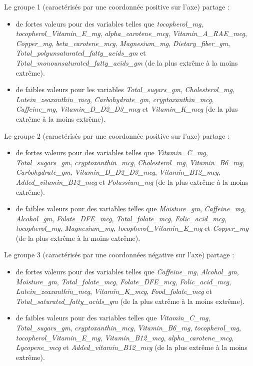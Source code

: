 \documentclass[]{article}
\providecommand{\tightlist}{%
  \setlength{\itemsep}{0pt}\setlength{\parskip}{0pt}}
\begin{document}
Le groupe 1 (caractérisés par une coordonnée positive sur l'axe) partage
:

\begin{itemize}
\tightlist
\item
  de fortes valeurs pour des variables telles que \emph{tocopherol\_mg},
  \emph{tocopherol\_Vitamin\_E\_mg}, \emph{alpha\_carotene\_mcg},
  \emph{Vitamin\_A\_RAE\_mcg}, \emph{Copper\_mg},
  \emph{beta\_carotene\_mcg}, \emph{Magnesium\_mg},
  \emph{Dietary\_fiber\_gm},
  \emph{Total\_polyunsaturated\_fatty\_acids\_gm} et
  \emph{Total\_monounsaturated\_fatty\_acids\_gm} (de la plus extrême à
  la moins extrême).
\item
  de faibles valeurs pour les variables \emph{Total\_sugars\_gm},
  \emph{Cholesterol\_mg}, \emph{Lutein\_zeaxanthin\_mcg},
  \emph{Carbohydrate\_gm}, \emph{cryptoxanthin\_mcg},
  \emph{Caffeine\_mg}, \emph{Vitamin\_D\_D2\_D3\_mcg} et
  \emph{Vitamin\_K\_mcg} (de la plus extrême à la moins extrême).
\end{itemize}

Le groupe 2 (caractérisés par une coordonnée positive sur l'axe) partage
:

\begin{itemize}
\tightlist
\item
  de fortes valeurs pour des variables telles que \emph{Vitamin\_C\_mg},
  \emph{Total\_sugars\_gm}, \emph{cryptoxanthin\_mcg},
  \emph{Cholesterol\_mg}, \emph{Vitamin\_B6\_mg},
  \emph{Carbohydrate\_gm}, \emph{Vitamin\_D\_D2\_D3\_mcg},
  \emph{Vitamin\_B12\_mcg}, \emph{Added\_vitamin\_B12\_mcg} et
  \emph{Potassium\_mg} (de la plus extrême à la moins extrême).
\item
  de faibles valeurs pour des variables telles que \emph{Moisture\_gm},
  \emph{Caffeine\_mg}, \emph{Alcohol\_gm}, \emph{Folate\_DFE\_mcg},
  \emph{Total\_folate\_mcg}, \emph{Folic\_acid\_mcg},
  \emph{tocopherol\_mg}, \emph{Magnesium\_mg},
  \emph{tocopherol\_Vitamin\_E\_mg} et \emph{Copper\_mg} (de la plus
  extrême à la moins extrême).
\end{itemize}

Le groupe 3 (caractérisés par une coordonnées négative sur l'axe)
partage :

\begin{itemize}
\tightlist
\item
  de fortes valeurs pour des variables telles que \emph{Caffeine\_mg},
  \emph{Alcohol\_gm}, \emph{Moisture\_gm}, \emph{Total\_folate\_mcg},
  \emph{Folate\_DFE\_mcg}, \emph{Folic\_acid\_mcg},
  \emph{Lutein\_zeaxanthin\_mcg}, \emph{Vitamin\_K\_mcg},
  \emph{Food\_folate\_mcg} et \emph{Total\_saturated\_fatty\_acids\_gm}
  (de la plus extrême à la moins extrême).
\item
  de faibles valeurs pour des variables telles que
  \emph{Vitamin\_C\_mg}, \emph{Total\_sugars\_gm},
  \emph{cryptoxanthin\_mcg}, \emph{Vitamin\_B6\_mg},
  \emph{tocopherol\_mg}, \emph{tocopherol\_Vitamin\_E\_mg},
  \emph{Vitamin\_B12\_mcg}, \emph{alpha\_carotene\_mcg},
  \emph{Lycopene\_mcg} et \emph{Added\_vitamin\_B12\_mcg} (de la plus
  extrême à la moins extrême).
\end{itemize}
\end{document}
